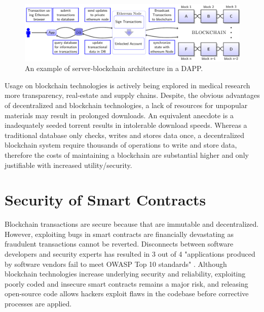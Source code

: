 \documentclass[12pt]{scrreprt}
\begin{document}
\begin{figure}[ht]
\centering
\includegraphics[width=1\linewidth]{ms-II/blockchainInSimpleApp.pdf}
\caption{An example of server-blockchain architecture in a DAPP.}
\label{fig:DApp}
\end{figure}
Usage on blockchain technologies is actively being explored in medical research \cite{pmid28357041} more transparency, real-estate and supply chains.
Despite, the obvious advantages of decentralized and blockchain technologies,  a lack of resources for unpopular materials may result in prolonged downloads. An equivalent anecdote is a inadequately seeded torrent results in intolerable download speeds.  Whereas a traditional database only checks, writes and stores data once, a decentralized blockchain system require thousands of operations to write and store data, therefore the costs of maintaining a blockchain are substantial higher and only justifiable with increased utility/security.

 \section{Security of Smart Contracts}
 
 Blockchain transactions are secure because that are immutable and decentralized. However, exploiting bugs in smart contracts are financially devastating \cite{funnyJoke:Online} as fraudulent transactions cannot be reverted. Disconnects between software developers and security experts has resulted in 3 out of 4 "applications produced by software vendors fail to meet OWASP Top 10 standards" \cite{veraCode:Report}. Although blockchain technologies increase underlying security and reliability, exploiting poorly coded and insecure smart contracts remains a major risk, and releasing open-source code allows hackers exploit flaws in the codebase before corrective processes are applied.  
\end{document}
